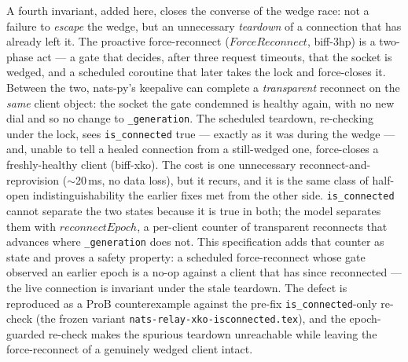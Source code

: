 \documentclass[a4paper,10pt,fleqn]{article}
\begin{document}
A fourth invariant, added here, closes the converse of the wedge race:
not a failure to \emph{escape} the wedge, but an unnecessary
\emph{teardown} of a connection that has already left it.  The proactive
force-reconnect ($ForceReconnect$, biff-3hp) is a two-phase act --- a
gate that decides, after three request timeouts, that the socket is
wedged, and a scheduled coroutine that later takes the lock and
force-closes it.  Between the two, nats-py's keepalive can complete a
\emph{transparent} reconnect on the \emph{same} client object: the
socket the gate condemned is healthy again, with no new dial and so no
change to \texttt{\_generation}.  The scheduled teardown, re-checking
under the lock, sees \texttt{is\_connected} true --- exactly as it was
during the wedge --- and, unable to tell a healed connection from a
still-wedged one, force-closes a freshly-healthy client (biff-xko).  The
cost is one unnecessary reconnect-and-reprovision ($\sim$20\,ms, no data
loss), but it recurs, and it is the same class of half-open
indistinguishability the earlier fixes met from the other side.
\texttt{is\_connected} cannot separate the two states because it is true
in both; the model separates them with $reconnectEpoch$, a per-client
counter of transparent reconnects that advances where
\texttt{\_generation} does not.  This specification adds that counter as
state and proves a safety property: a scheduled force-reconnect whose
gate observed an earlier epoch is a no-op against a client that has since
reconnected --- the live connection is invariant under the stale
teardown.  The defect is reproduced as a ProB counterexample against the
pre-fix \texttt{is\_connected}-only re-check (the frozen variant
\texttt{nats-relay-xko-isconnected.tex}), and the epoch-guarded re-check
makes the spurious teardown unreachable while leaving the force-reconnect
of a genuinely wedged client intact.
\end{document}

